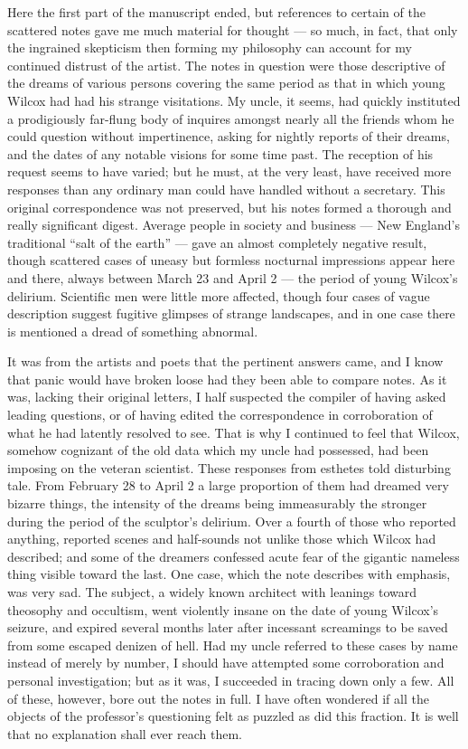 Here the first part of the manuscript ended, but references to certain
of the scattered notes gave me much material for thought --- so much, in
fact, that only the ingrained skepticism then forming my philosophy can
account for my continued distrust of the artist. The notes in question
were those descriptive of the dreams of various persons covering the
same period as that in which young Wilcox had had his strange
visitations. My uncle, it seems, had quickly instituted a prodigiously
far-flung body of inquires amongst nearly all the friends whom he could
question without impertinence, asking for nightly reports of their
dreams, and the dates of any notable visions for some time past. The
reception of his request seems to have varied; but he must, at the very
least, have received more responses than any ordinary man could have
handled without a secretary. This original correspondence was not
preserved, but his notes formed a thorough and really significant
digest. Average people in society and business --- New England's
traditional ``salt of the earth'' --- gave an almost completely negative
result, though scattered cases of uneasy but formless nocturnal
impressions appear here and there, always between March 23 and April 2 ---
the period of young Wilcox's delirium. Scientific men were little more
affected, though four cases of vague description suggest fugitive
glimpses of strange landscapes, and in one case there is mentioned a
dread of something abnormal.

It was from the artists and poets that the pertinent answers came, and I
know that panic would have broken loose had they been able to compare
notes. As it was, lacking their original letters, I half suspected the
compiler of having asked leading questions, or of having edited the
correspondence in corroboration of what he had latently resolved to see.
That is why I continued to feel that Wilcox, somehow cognizant of the
old data which my uncle had possessed, had been imposing on the veteran
scientist. These responses from esthetes told disturbing tale. From
February 28 to April 2 a large proportion of them had dreamed very
bizarre things, the intensity of the dreams being immeasurably the
stronger during the period of the sculptor's delirium. Over a fourth of
those who reported anything, reported scenes and half-sounds not unlike
those which Wilcox had described; and some of the dreamers confessed
acute fear of the gigantic nameless thing visible toward the last. One
case, which the note describes with emphasis, was very sad. The subject,
a widely known architect with leanings toward theosophy and occultism,
went violently insane on the date of young Wilcox's seizure, and expired
several months later after incessant screamings to be saved from some
escaped denizen of hell. Had my uncle referred to these cases by name
instead of merely by number, I should have attempted some corroboration
and personal investigation; but as it was, I succeeded in tracing down
only a few. All of these, however, bore out the notes in full. I have
often wondered if all the objects of the professor's questioning felt as
puzzled as did this fraction. It is well that no explanation shall ever
reach them.

